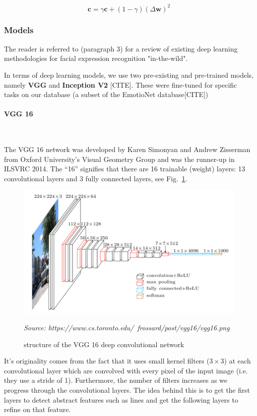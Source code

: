 \documentclass[12pt,twoside]{article}
\newcommand{\source}[1]{\vspace{-3pt} \caption*{ \footnotesize{\textit{Source: {#1}}}} }
\newcommand{\para}[1]{\paragraph{#1}\mbox{}\\}
\begin{document}
\begin{equation}
  \bm{c} = \gamma \bm{c} + (1-\gamma) \left( \Delta\bm{w} \right)^2
  \label{eq:rmsprop}
\end{equation}



\subsubsection{Models}\label{sec:models}

The reader is referred to \cite{RefWorks:2} (paragraph 3) for a review of existing deep learning methodologies for facial expression recognition "in-the-wild".

In terms of deep learning models, we use two pre-existing and pre-trained models, namely \textbf{VGG} \cite{RefWorks:21} and
\textbf{Inception V2} [CITE]. These were fine-tuned for specific tasks on our
database (a subset of the EmotioNet database[CITE])

\para{VGG 16}\label{para:vgg16}

The VGG 16 network was developed by Karen Simonyan and Andrew Zisserman from
Oxford University's Visual Geometry Group and was the runner-up in ILSVRC 2014. 
The ``16'' signifies that there are 16 trainable (weight) layers: 13 convolutional
layers and 3 fully connected layers, see Fig.~\ref{fig:vgg16}.

\begin{figure}[ht]
  \centering
  \includegraphics[scale=0.7]{figures/vgg16.png}
  \caption{structure of the VGG 16 deep convolutional network}
  \source{https://www.cs.toronto.edu/~frossard/post/vgg16/vgg16.png}
  \label{fig:vgg16}
\end{figure}

It's originality comes from the fact that it uses small kernel filters
($3 \times 3$) at each convolutional layer which are convolved with every
pixel of the input image (i.e. they use a stride of 1). Furthermore, 
the number of filters increases as we progress through the convolutional layers.
The idea behind this is to get the first layers to detect abstract features
such as lines and get the following layers to refine on that feature.
\end{document}
